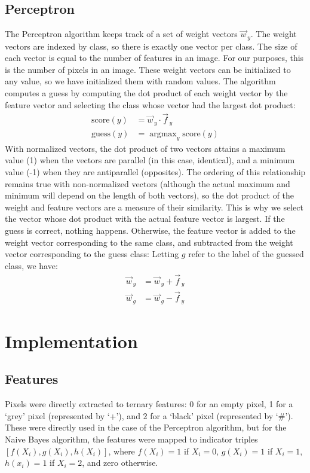 \documentclass{article}
\DeclareMathOperator*{\argmax}{argmax}
\begin{document}
  \subsection{Perceptron}
  The Perceptron algorithm keeps track of a set of weight vectors $\vec{w}_{\,y}$.
  The weight vectors are indexed by class, so there is exactly one vector per class.
  The size of each vector is equal to the number of features in an image.
  For our purposes, this is the number of pixels in an image.
  These weight vectors can be initialized to any value, so we have initialized them with random values.
  The algorithm computes a guess by computing the dot product of each weight vector by the feature vector and selecting the class whose vector had the largest dot product: 
  \begin{align*}
  \text{score}(y) &= \vec{w}_{\,y} \cdot \vec{f}_{\,y} \\
  \text{guess}(y) &= \argmax_y \text{score}(y)
  \end{align*}
  With normalized vectors, the dot product of two vectors attains a maximum value (1) when the vectors are parallel (in this case, identical), and a minimum value (-1) when they are antiparallel (opposites).
  The ordering of this relationship remains true with non-normalized vectors (although the actual maximum and minimum will depend on the length of both vectors), so the dot product of the weight and feature vectors are a measure of their similarity.
  This is why we select the vector whose dot product with the actual feature vector is largest.
  If the guess is correct, nothing happens. Otherwise, the feature vector is added to the weight vector corresponding to the same class, and subtracted from the weight vector corresponding to the guess class:
  Letting $g$ refer to the label of the guessed class, we have:
  \begin{align*}
  \vec{w}_{\,y}  &= \vec{w}_{\,y} + \vec{f}_{\,y} \\
  \vec{w}_{\,g}  &= \vec{w}_{\,g} - \vec{f}_{\,y} 
  \end{align*}
  \section{Implementation}
  \subsection{Features}
  Pixels were directly extracted to ternary features: 0 for an empty pixel, 1 for a `grey' pixel (represented by `+'), and 2 for a `black' pixel (represented by `\#').
  These were directly used in the case of the Perceptron algorithm, but for the Naive Bayes algorithm, the features were mapped to indicator triples $[f(X_i), g(X_i), h(X_i)]$,
  where $f(X_i) = 1$ if $X_i = 0$, $g(X_i) = 1$ if $X_i = 1$, $h(x_i) = 1$ if $X_i = 2$, and zero otherwise.
\end{document}
